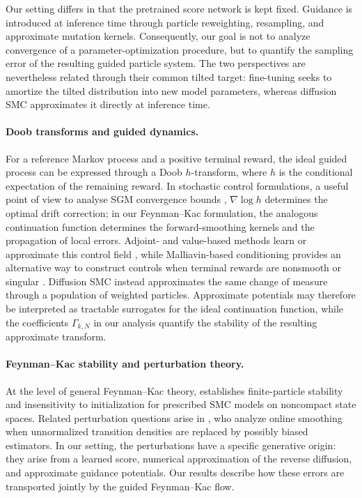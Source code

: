 \documentclass[11pt]{article}
\theoremstyle{plain}
\theoremstyle{definition}
\theoremstyle{remark}
\begin{document}
Our setting differs in that the pretrained score network is kept fixed.
Guidance is introduced at inference time through particle reweighting,
resampling, and approximate mutation kernels. Consequently, our goal is
not to analyze convergence of a parameter-optimization procedure, but to
quantify the sampling error of the resulting guided particle system. The
two perspectives are nevertheless related through their common tilted
target: fine-tuning seeks to amortize the tilted distribution into new
model parameters, whereas diffusion SMC approximates it directly at
inference time.

\paragraph{Doob transforms and guided dynamics.}
For a reference Markov process and a positive terminal reward, the ideal
guided process can be expressed through a Doob $h$-transform, where
$h$ is the conditional expectation of the remaining reward. In stochastic
control formulations, a useful point of view to analyse SGM convergence bounds \citep{conforti_kl, pham2025discrete,conforti2025non,silveri205beyond}, $\nabla\log h$ determines the optimal drift
correction; in our Feynman--Kac formulation, the analogous continuation
function determines the forward-smoothing kernels and the propagation of
local errors. Adjoint- and value-based methods learn or approximate this
control field
\citep{domingo2025adjoint,havens2025adjoint,liu2025valuegradient,
domingo2026unified,domingo2026smp}, while Malliavin-based conditioning
provides an alternative way to construct controls when terminal rewards
are nonsmooth or singular \citep{pidstrigach2025malliavin}. Diffusion SMC
instead approximates the same change of measure through a population of
weighted particles. Approximate potentials may therefore be interpreted
as tractable surrogates for the ideal continuation function, while the
coefficients $\Gamma_{k,N}$ in our analysis quantify the stability of the
resulting approximate transform.

\paragraph{Feynman--Kac stability and perturbation theory.}
At the level of general Feynman--Kac theory,
\citet{whiteley2012sequential} establishes finite-particle stability and
insensitivity to initialization for prescribed SMC models on noncompact
state spaces. Related perturbation questions arise in
\citet{gloaguen2022pseudo}, who analyze online smoothing when
unnormalized transition densities are replaced by possibly biased
estimators. In our setting, the perturbations have a specific generative
origin: they arise from a learned score, numerical approximation of the
reverse diffusion, and approximate guidance potentials. Our results
describe how these errors are transported jointly by the guided
Feynman--Kac flow.
\end{document}
